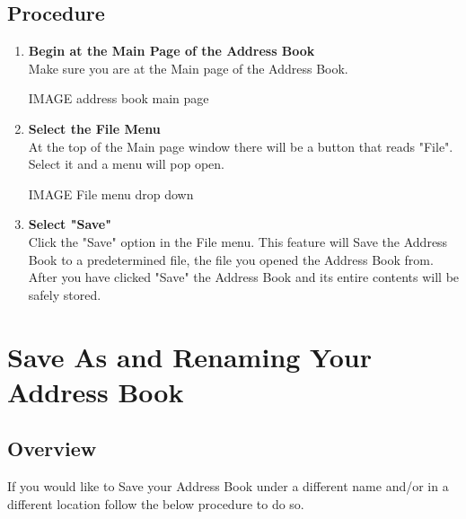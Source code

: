 \documentclass[a4paper, 11pt]{article}
\newlength{\drop}
\begin{document}
\subsection{Procedure}
\begin{enumerate}[label=\textbf{\arabic*})]
    \item{\textbf{Begin at the Main Page of the Address Book}}\\ Make sure you are at the Main page of the Address Book.
    
    IMAGE address book main page
    
    \item{\textbf{Select the File Menu}}\\ At the top of the Main page window there will be a button that reads "File". Select it and a menu will pop open.
    
    IMAGE File menu drop down  
    
    \item{\textbf{Select "Save"}}\\ Click the "Save" option in the File menu. This feature will Save the Address Book to a predetermined file, the file you opened the Address Book from. After you have clicked "Save" the Address Book and its entire contents will be safely stored. 
\end{enumerate}


\section{Save As and Renaming Your Address Book}
\subsection{Overview}
If you would like to Save your Address Book under a different name and/or in a different location follow the below procedure to do so.
\end{document}
